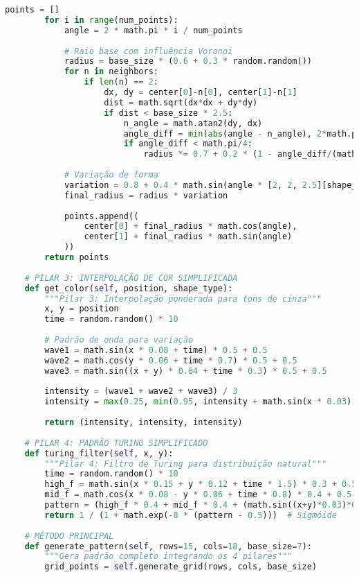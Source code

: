\documentclass[12pt,a4paper,oneside]{extarticle}
\begin{document}
\begin{lstlisting}[language=Python,caption={Implementação do Sistema de Simulação de Padrões de Escamas}]
        points = []
        for i in range(num_points):
            angle = 2 * math.pi * i / num_points
            
            # Raio base com influência Voronoi
            radius = base_size * (0.6 + 0.3 * random.random())
            for n in neighbors:
                if len(n) == 2:
                    dx, dy = center[0]-n[0], center[1]-n[1]
                    dist = math.sqrt(dx*dx + dy*dy)
                    if dist < base_size * 2.5:
                        n_angle = math.atan2(dy, dx)
                        angle_diff = min(abs(angle - n_angle), 2*math.pi - abs(angle - n_angle))
                        if angle_diff < math.pi/4:
                            radius *= 0.7 + 0.2 * (1 - angle_diff/(math.pi/4))
            
            # Variação de forma
            variation = 0.8 + 0.4 * math.sin(angle * [2, 2, 2.5][shape_type])
            final_radius = radius * variation
            
            points.append((
                center[0] + final_radius * math.cos(angle),
                center[1] + final_radius * math.sin(angle)
            ))
        return points
    
    # PILAR 3: INTERPOLAÇÃO DE COR SIMPLIFICADA
    def get_color(self, position, shape_type):
        """Pilar 3: Interpolação ponderada para tons de cinza"""
        x, y = position
        time = random.random() * 10
        
        # Padrão de onda para variação
        wave1 = math.sin(x * 0.08 + time) * 0.5 + 0.5
        wave2 = math.cos(y * 0.06 + time * 0.7) * 0.5 + 0.5
        wave3 = math.sin((x + y) * 0.04 + time * 0.3) * 0.5 + 0.5
        
        intensity = (wave1 + wave2 + wave3) / 3
        intensity = max(0.25, min(0.95, intensity + math.sin(x * 0.03) * 0.1))
        
        return (intensity, intensity, intensity)
    
    # PILAR 4: PADRÃO TURING SIMPLIFICADO
    def turing_filter(self, x, y):
        """Pilar 4: Filtro de Turing para distribuição natural"""
        time = random.random() * 10
        high_f = math.sin(x * 0.15 + y * 0.12 + time * 1.5) * 0.3 + 0.5
        mid_f = math.cos(x * 0.08 - y * 0.06 + time * 0.8) * 0.4 + 0.5
        pattern = (high_f * 0.4 + mid_f * 0.4 + (math.sin((x+y)*0.03)*0.3+0.5)*0.2)
        return 1 / (1 + math.exp(-8 * (pattern - 0.5)))  # Sigmóide
    
    # MÉTODO PRINCIPAL
    def generate_pattern(self, rows=15, cols=18, base_size=7):
        """Gera padrão completo integrando os 4 pilares"""
        grid_points = self.generate_grid(rows, cols, base_size)
        

\end{lstlisting}
\end{document}
